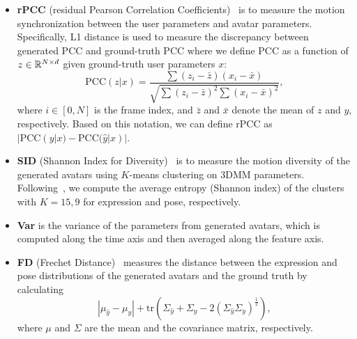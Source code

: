 \begin{itemize}[leftmargin=1.5em]
\item \textbf{rPCC} (residual Pearson Correlation Coefficients)~\citep{dim} is to measure the motion synchronization between the user parameters and avatar parameters. Specifically, L1 distance is used to measure the discrepancy between generated PCC and ground-truth PCC where we define PCC as a function of $z\in\mathbb{R}^{N\times d}$ given ground-truth user parameters $x$:
\begin{equation}
    \text{PCC}(z|x) = \frac{\sum (z_i - \bar{z})(x_i - \bar{x})}{\sqrt{\sum(z_i - \bar{z})^2 \sum (x_i - \bar{x})^2}},
\end{equation}
where $i\in[0,N]$ is the frame index, and $\bar{z}$ and $\bar{x}$ denote the mean of $z$ and $y$, respectively. Based on this notation, we can define rPCC as $|\text{PCC}(y|x) - \text{PCC}(\hat{y}|x)|$. 

\item \textbf{SID} (Shannon Index for Diversity)~\citep{l2l} is to measure the motion diversity of the generated avatars using $K$-means clustering on 3DMM parameters. Following~\citep{l2l}, we compute the average entropy (Shannon index) of the clusters with $K=15, 9$ for expression and pose, respectively.

\item \textbf{Var} is the variance of the parameters from generated avatars, which is computed along the time axis and then averaged along the feature axis. 

\item \textbf{FD} (Frechet Distance)~\citep{fid} measures the distance between the expression and pose distributions of the generated avatars and the ground truth by calculating
\begin{equation}
    |\mu_{\hat{y}} - \mu_{y}| + \text{tr}(\Sigma_{\hat{y}} + \Sigma_{y} - 2 (\Sigma_{\hat{y}} \Sigma_{y})^{\frac{1}{2}}), \label{eq:fd}
\end{equation}
where $\mu$ and $\Sigma$ are the mean and the covariance matrix, respectively.
\end{itemize}



